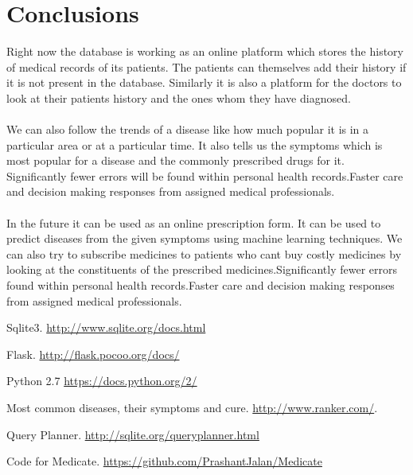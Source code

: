 \documentclass{article}
\begin{document}
\section{Conclusions}

Right now the database is working as an online platform which stores the history of medical records of its patients. The patients can themselves add their history if it is not present in the database. Similarly it is also a platform for the doctors to look at their patients history and the ones whom they have diagnosed.\\\\
We can also follow the trends of a disease like how much popular it is in a particular area or at a particular time. It also tells us the symptoms which is most popular for a disease and the commonly prescribed drugs for it.
Significantly fewer errors will be found within personal health records.Faster care and decision making responses from assigned medical professionals.\\\\
In the future it can be used as an online prescription form. It can be used to predict diseases from the given symptoms using machine learning techniques. We can also try to subscribe medicines to patients who cant buy costly medicines by looking at the constituents of the prescribed medicines.Significantly fewer errors found within personal health records.Faster care and decision making responses from assigned medical professionals.

\begin{thebibliography}{9}


Sqlite3. \url{http://www.sqlite.org/docs.html}

Flask. \url{http://flask.pocoo.org/docs/}

Python 2.7 \url{https://docs.python.org/2/}

Most common diseases, their symptoms and cure. \url{http://www.ranker.com/}.

Query Planner. \url{http://sqlite.org/queryplanner.html}

Code for Medicate. \url{https://github.com/PrashantJalan/Medicate}

\end{thebibliography}
\end{document}
